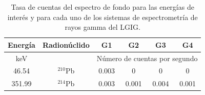 \begin{table}[h]
\centering
\caption{Tasa de cuentas del espectro de fondo para las energías de interés y para cada uno de los sistemas de espectrometría de rayos gamma del LGIG.}\label{Table-CuentasBackground}
\begin{tabular}{|c|c|c|c|c|c|}
	\hline												
\rowcolor{Blue2}	Energía 	&	Radionúclido 	&	G1	&	G2	&	G3	&	G4	\\	\hline
	keV	&		&	 \multicolumn{4}{c|}{Número de cuentas por segundo}           							\\	\hline
\rowcolor{Blue1}	46.54	&	$^{210}$Pb	&	0.003	&	0	&	0	&	0	\\	
\rowcolor{Blue1}	351.99	&	$^{214}$Pb	&	0.003	&	0.001	&	0.004	&	0.001	\\	\hline
\end{tabular}
\end{table}
